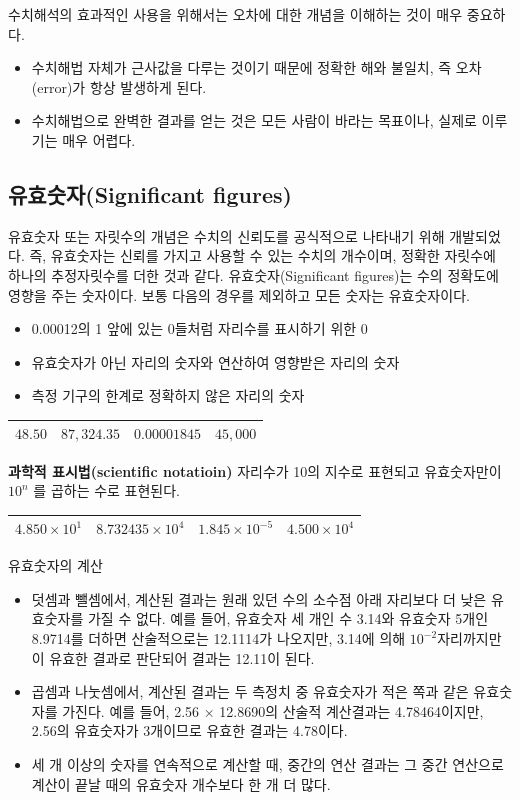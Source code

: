 수치해석의 효과적인 사용을 위해서는 오차에 대한 개념을 이해하는 것이 매우 중요하다.
\begin{itemize}
\item 수치해법 자체가 근사값을 다루는 것이기 때문에 정확한 해와 불일치, 즉 오차(error)가 항상 발생하게 된다. 
\item 수치해법으로 완벽한 결과를 얻는 것은 모든 사람이 바라는 목표이나, 실제로 이루기는 매우 어렵다.
\end{itemize}

\subsection{유효숫자(Significant figures)}
유효숫자 또는 자릿수의 개념은 수치의 신뢰도를 공식적으로 나타내기 위해 개발되었다. 즉, 유효숫자는 신뢰를 가지고 사용할 수 있는 수치의 개수이며, 정확한 자릿수에 하나의 추정자릿수를 더한 것과 같다. 
유효숫자(Significant figures)는 수의 정확도에 영향을 주는 숫자이다. 보통 다음의 경우를 제외하고 모든 숫자는 유효숫자이다.
\begin{itemize}
\item 0.00012의 1 앞에 있는 0들처럼 자리수를 표시하기 위한 0
\item 유효숫자가 아닌 자리의 숫자와 연산하여 영향받은 자리의 숫자
\item 측정 기구의 한계로 정확하지 않은 자리의 숫자
\end{itemize}

\begin{table}[!hb]
\centering
\begin{tabular}{|c|c|c|c|}
\hline
$48.50$&$87,324.35$&$0.00001845$&$45,000$\\
\hline
\end{tabular}
\end{table}

\textbf{과학적 표시법(scientific notatioin)} 자리수가 10의 지수로 표현되고 유효숫자만이 $10^{n}$ 를 곱하는 수로 표현된다.
\begin{table}[!hb]
\centering
\begin{tabular}{|c|c|c|c|}
\hline
$4.850\times 10^1$&$8.732435\times 10^4$&$1.845\times 10^{-5}$&$4.500 \times 10^4$\\
\hline
\end{tabular}
\end{table}

유효숫자의 계산
\begin{itemize}
\item 덧셈과 뺄셈에서, 계산된 결과는 원래 있던 수의 소수점 아래 자리보다 더 낮은 유효숫자를 가질 수 없다. 예를 들어, 유효숫자 세 개인 수 3.14와 유효숫자 5개인 8.9714를 더하면 산술적으로는 12.1114가 나오지만, 3.14에 의해 $10^{-2}$자리까지만이 유효한 결과로 판단되어 결과는 12.11이 된다.
\item 곱셈과 나눗셈에서, 계산된 결과는 두 측정치 중 유효숫자가 적은 쪽과 같은 유효숫자를 가진다. 예를 들어, 2.56 × 12.8690의 산술적 계산결과는 4.78464이지만, 2.56의 유효숫자가 3개이므로 유효한 결과는 4.78이다.
\item 세 개 이상의 숫자를 연속적으로 계산할 때, 중간의 연산 결과는 그 중간 연산으로 계산이 끝날 때의 유효숫자 개수보다 한 개 더 많다.
\end{itemize}

